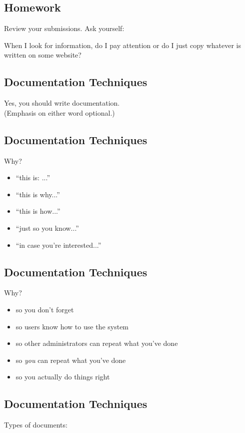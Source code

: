 \documentclass[xga]{xdvislides}
\begin{document}
\subsection{Homework}
Review your submissions.  Ask yourself:
\vfill
\Huge
\begin{center}
       When I look for information, do I pay attention or do I just copy
       whatever is written on some website?
\end{center}
\Normalsize
\vfill

\subsection{Documentation Techniques}
\vfill
\begin{center}
\Huge
Yes, you should write documentation. \\
\small
(Emphasis on either word optional.)
\Normalsize
\end{center}
\vfill

\subsection{Documentation Techniques}
Why?
\begin{itemize}
	\item ``this is: ...''
	\item ``this is why...''
	\item ``this is how...''
	\item ``just so you know...''
	\item ``in case you're interested...''
\end{itemize}

\subsection{Documentation Techniques}
Why?
\begin{itemize}
	\item so you don't forget
	\item so users know how to use the system
	\item so other administrators can repeat what you've done
	\item so {\em you} can repeat what you've done
	\item so you actually do things right
\end{itemize}

\subsection{Documentation Techniques}
Types of documents:
\end{document}
